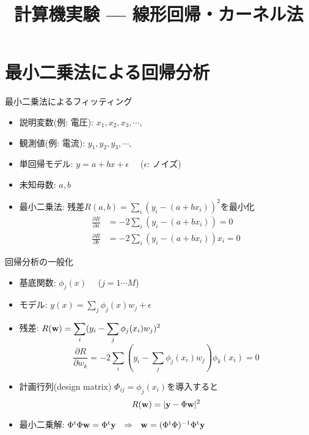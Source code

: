 \documentclass[dvipdfmx]{beamer}
\title{計算機実験 --- 線形回帰・カーネル法}
\begin{document}

\begin{frame}
  \titlepage
  \tableofcontents
\end{frame}

\section{最小二乗法による回帰分析}

\begin{frame}[t,fragile]{最小二乗法によるフィッティング}
  \begin{itemize}
  \item 説明変数(例: 電圧): $x_1,x_2,x_3,\cdots,$
  \item 観測値(例: 電流): $y_1,y_2,y_3,\cdots,$
  \item 単回帰モデル: $y=a+bx+\epsilon$ \ \ ($\epsilon$: ノイズ)
  \item 未知母数: $a,b$
  \item 最小二乗法:
    残差$\displaystyle R(a,b) = \sum_i (y_i - (a+bx_i))^2$を最小化
    \[
    \begin{split}
      \frac{\partial R}{\partial a} &= - 2 \sum_i (y_i - (a+bx_i)) = 0 \\
      \frac{\partial R}{\partial b} &= - 2 \sum_i (y_i - (a+bx_i))x_i = 0
    \end{split}
    \]
  \end{itemize}
\end{frame}

\begin{frame}[t,fragile]{回帰分析の一般化}
  \begin{itemize}
  \item 基底関数: $\phi_j(x)$ \ \ ($j=1 \cdots M$)
  \item モデル: $\displaystyle y(x) = \sum_j \phi_j(x) w_j + \epsilon$
  \item 残差: $\displaystyle R({\bf w}) = \sum_i (y_i - \sum_j \phi_j(x_i) w_j)^2$
    \[
    \frac{\partial R}{\partial w_k} = -2 \sum_i (y_i - \sum_j \phi_j(x_i) w_j) \phi_k(x_i) = 0
    \]
  \item 計画行列(design matrix) $\Phi_{ij} = \phi_j(x_i)$を導入すると
    \[
    R({\bf w}) = | {\bf y} - \Phi {\bf w} |^2
    \]
  \item 最小二乗解: $\Phi^{\rm t} \Phi {\bf w} = \Phi^{\rm t} {\bf y} \ \ \Rightarrow \ \
{\bf w} = (\Phi^{\rm t} \Phi)^{-1}\Phi^{\rm t} {\bf y}$
  \end{itemize}
\end{frame}
\end{document}
